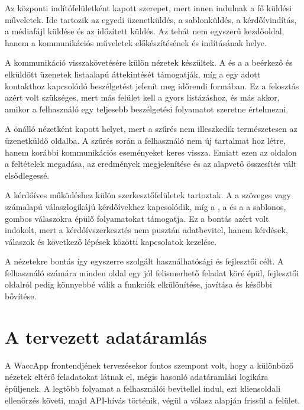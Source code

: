 Az  központi indítófelületként kapott szerepet, mert innen indulnak a fő küldési műveletek. Ide tartozik az egyedi üzenetküldés, a sablonküldés, a kérdőívindítás, a médiafájl küldése és az időzített küldés. Az  tehát nem egyszerű kezdőoldal, hanem a kommunikációs műveletek előkészítésének és indításának helye.

A kommunikáció visszakövetésére külön nézetek készültek. A  és a  a beérkező és elküldött üzenetek listaalapú áttekintését támogatják, míg a  egy adott kontakthoz kapcsolódó beszélgetést jelenít meg időrendi formában. Ez a felosztás azért volt szükséges, mert más felület kell a gyors listázáshoz, és más akkor, amikor a felhasználó egy teljesebb beszélgetési folyamatot szeretne értelmezni.

A  önálló nézetként kapott helyet, mert a szűrés nem illeszkedik természetesen az üzenetküldő oldalba. A szűrés során a felhasználó nem új tartalmat hoz létre, hanem korábbi kommunikációs eseményeket keres vissza. Emiatt ezen az oldalon a feltételek megadása, az eredmények megjelenítése és az alapvető összesítés vált elsődlegessé.

A kérdőíves működéshez külön szerkesztőfelületek tartoztak. A  a szöveges vagy számalapú válaszlogikájú kérdőívekhez kapcsolódik, míg a , a  és a  a sablonos, gombos válaszokra épülő folyamatokat támogatja. Ez a bontás azért volt indokolt, mert a kérdőívszerkesztés nem pusztán adatbevitel, hanem kérdések, válaszok és következő lépések közötti kapcsolatok kezelése.

A nézetekre bontás így egyszerre szolgált használhatósági és fejlesztői célt. A felhasználó számára minden oldal egy jól felismerhető feladat köré épül, fejlesztői oldalról pedig könnyebbé válik a funkciók elkülönítése, javítása és későbbi bővítése.

\section{A tervezett adatáramlás}

A WaccApp frontendjének tervezésekor fontos szempont volt, hogy a különböző nézetek eltérő feladatokat látnak el, mégis hasonló adatáramlási logikára épüljenek. A legtöbb folyamat a felhasználói bevitellel indul, ezt kliensoldali ellenőrzés követi, majd API-hívás történik, végül a válasz alapján frissül a felület.

